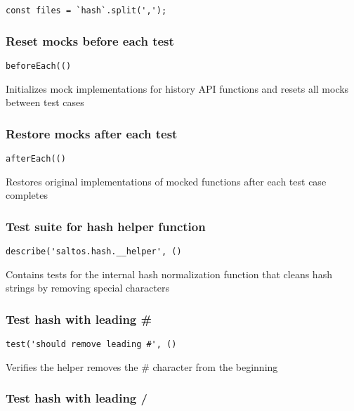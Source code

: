 \documentclass[a4paper]{article}
\begin{document}
\begin{lstlisting}
const files = `hash`.split(',');
\end{lstlisting}

\hypertarget{toc191}{}
\subsubsection{Reset mocks before each test}

\begin{lstlisting}
beforeEach(()
\end{lstlisting}

Initializes mock implementations for history API functions
and resets all mocks between test cases

\hypertarget{toc192}{}
\subsubsection{Restore mocks after each test}

\begin{lstlisting}
afterEach(()
\end{lstlisting}

Restores original implementations of mocked functions
after each test case completes

\hypertarget{toc193}{}
\subsubsection{Test suite for hash helper function}

\begin{lstlisting}
describe('saltos.hash.__helper', ()
\end{lstlisting}

Contains tests for the internal hash normalization function
that cleans hash strings by removing special characters

\hypertarget{toc194}{}
\subsubsection{Test hash with leading \#}

\begin{lstlisting}
test('should remove leading #', ()
\end{lstlisting}

Verifies the helper removes the \# character from the beginning

\hypertarget{toc195}{}
\subsubsection{Test hash with leading /}
\end{document}
